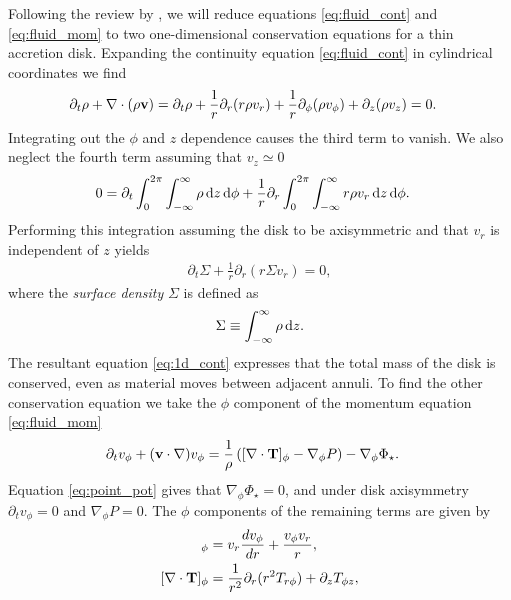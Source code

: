Following the review by \citet{papaloizou1995}, we will reduce equations \ref{eq:fluid_cont} and \ref{eq:fluid_mom} to two one-dimensional conservation equations for a thin accretion disk.
Expanding the continuity equation \ref{eq:fluid_cont} in cylindrical coordinates we find
\begin{align}
    \partial_t \rho + \nabla \cdot (\rho \mathbf{v}) &= \partial_t \rho + \frac{1}{r} \partial_r (r \rho v_r) + \frac{1}{r} \partial_\phi (\rho v_\phi) + \partial_z (\rho v_z) = 0.
\end{align}
Integrating out the $\phi$ and $z$ dependence causes the third term to vanish. We also neglect the fourth term assuming that $v_z \simeq 0$
\begin{align}
    0 &= \partial_t \int_0^{2\pi} \int_{-\infty}^\infty \rho \mathop{}\!\mathrm{d}{z} \mathop{}\!\mathrm{d}{\phi} + \frac{1}{r} \partial_r \int_0^{2\pi} \int_{-\infty}^\infty r \rho v_r \mathop{}\!\mathrm{d}{z} \mathop{}\!\mathrm{d}{\phi}. \label{eq:int_cont}
\end{align}
Performing this integration assuming the disk to be axisymmetric and that $v_r$ is independent of $z$ yields
\begin{align}
    \partial_t \Sigma + \frac{1}{r} \partial_r (r \Sigma v_r) = 0, \label{eq:1d_cont}
\end{align}
where the \textit{surface density} $\Sigma$ is defined as 
\begin{align}
    \Sigma \equiv \int_{-\infty}^\infty \rho \mathop{}\!\mathrm{d}{z}. \label{eq:surf_dens_def}
\end{align} 
The resultant equation \ref{eq:1d_cont} expresses that the total mass of the disk is conserved, even as material moves between adjacent annuli.
To find the other conservation equation we take the $\phi$ component of the momentum equation \ref{eq:fluid_mom}
\begin{align}
    \partial_t v_\phi + (\mathbf{v} \cdot \nabla) v_\phi &= \frac{1}{\rho} \left( [\nabla \cdot \mathbf{T}]_\phi - \nabla_\phi P  \right) - \nabla_\phi \Phi_\star.
\end{align}
Equation \ref{eq:point_pot} gives that $\nabla_\phi \Phi_\star = 0$, and under disk axisymmetry $\partial_t v_\phi = 0$ and $\nabla_\phi P=0$.
The $\phi$ components of the remaining terms are given by \citep[e.g.][]{landau1959}
\begin{align}
    [(v \cdot \nabla) \VF{v}]_\phi &= v_r \frac{dv_\phi}{dr} + \frac{v_\phi v_r}{r}, \\
    [\nabla \cdot \VF{T}]_\phi &= \frac{1}{r^2} \partial_r (r^2 T_{r\phi}) + \partial_z T_{\phi z},
\end{align}

